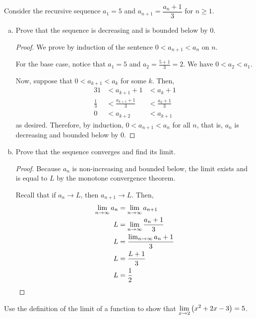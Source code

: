 \question Consider the recursive sequence $a_1=5$ and $a_{n+1}=\dfrac{a_n+1}{3}$ for $n \geq 1$.
\begin{enumerate}[(a)]
  \item Prove that the sequence is decreasing and is bounded below by 0.
        \begin{proof}
          We prove by induction of the sentence $0<a_{n+1}<a_n$ on $n$.

          For the base case, notice that $a_1=5$ and $a_2=\frac{5+1}{3}=2$.
          We have $0 < a_2 < a_1$.

          Now, suppose that $0<a_{k+1}<a_k$ for some $k$. Then,
          \begin{alignat*}{3}
            1           & < a_{k+1}+1           & < a_k+1           \\
            \frac{1}{3} & < \frac{a_{k+1}+1}{3} & < \frac{a_k+1}{3} \\
            0           & < a_{k+2}             & < a_{k+1}
          \end{alignat*}
          as desired.
          Therefore, by induction, $0<a_{n+1}<a_n$ for all $n$, that is,
          $a_n$ is decreasing and bounded below by 0.
        \end{proof}
  \item Prove that the sequence converges and find its limit.
        \begin{proof}
          Because $a_n$ is non-increasing and bounded below, the limit exists and is equal to $L$ by the monotone convergence theorem.

          Recall that if $a_n \to L$, then $a_{n+1} \to L$. Then,
          \begin{align*}
            \lim_{n\to\infty} a_n & = \lim_{n\to\infty} a_{n+1}         \\
            L            & = \lim_{n\to\infty} \frac{a_n+1}{3} \\
            L            & = \frac{\lim_{n\to\infty}a_n+1}{3}  \\
            L            & = \frac{L+1}{3}            \\
            L            & = \frac{1}{2} \qedhere
          \end{align*}
        \end{proof}
\end{enumerate}


\question Use the \epsdel{} definition of the limit of a function to show that
$\displaystyle\lim_{x\to2}\left(x^2+2x-3\right)=5$.

